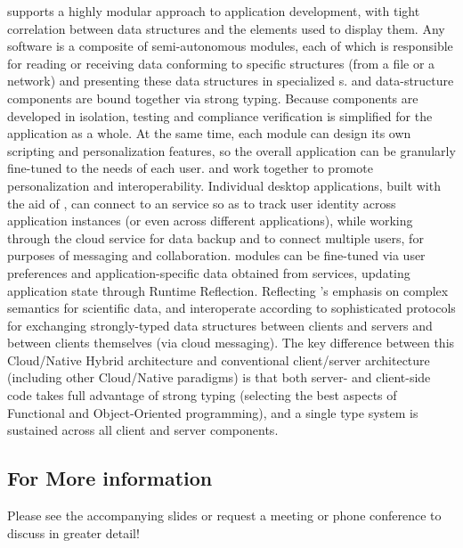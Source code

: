 \documentclass[11pt,letterpaper]{article}
\begin{document}
supports a highly modular approach to 
application development, with tight 
correlation between data structures and the {\GUI} 
elements used to display them.  Any {\VersatileUX} 
software is a composite of semi-autonomous  
modules, each of which is responsible for 
reading or receiving data conforming 
to specific structures (from a file or a network) 
and presenting these data structures in specialized 
{\GUI}s.  {\lfGUI} and data-structure components are 
bound together via strong typing.  Because {\VersatileUX} 
components are developed in isolation, testing and 
compliance verification is simplified for the application 
as a whole.  At the same time, each {\VersatileUX} 
module can design its own scripting and personalization 
features, so the overall application can be 
granularly fine-tuned to the needs of each user.
\EnglischeLinie
{\lfNDPCloud} and {\VersatileUX} work together to 
promote personalization and interoperability.  
Individual desktop applications, built 
with the aid of {\VersatileUX}, can connect to an 
{\NDPCloud} service so as to track user identity across 
application instances (or even across different applications), 
while working through the cloud service for data backup and 
to connect multiple users, for purposes of 
messaging and collaboration.  
{\VersatileUX} modules can be fine-tuned via 
user preferences and application-specific data obtained from 
{\NDPCloud} services, updating application state through  
Runtime Reflection.  Reflecting {\MOSAIC}'s 
emphasis on complex semantics for scientific data, 
{\NDPCloud} and {\VersatileUX} interoperate according to  
sophisticated protocols for exchanging 
strongly-typed data structures between clients and 
servers and between clients themselves (via cloud messaging).  
The key difference between this Cloud/Native Hybrid 
architecture and conventional client/server architecture 
(including other Cloud/Native paradigms) is that 
both server- and client-side code takes full advantage of 
strong typing (selecting the best aspects of 
Functional and Object-Oriented programming), 
and a single type system is 
sustained across all client and server components.

\subsection{For More information}
Please see the accompanying slides or request a meeting 
or phone conference to discuss {\MOSAIC} in greater detail!
\end{document}
